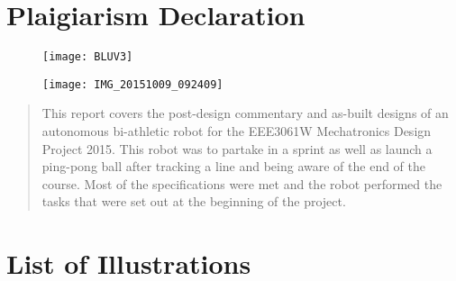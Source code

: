 \frontmatter
\setcounter{tocdepth}{3}                                                      %
\setcounter{secnumdepth}{2}                                     %

\clearpage
\section*{Plaigiarism Declaration}
\label{sec:Plaigiarism Declaration}

\clearpage
\begin{figure}[H]
  \begin{center}
    \texttt{[image: BLUV3]}
  \end{center}
\end{figure}

\begin{figure}[H]
  \begin{center}
    \texttt{[image: IMG\_20151009\_092409]}
  \end{center}
\end{figure}


\begin{abstract}
  \thispagestyle{empty}
  This report covers the post-design commentary and as-built designs of an autonomous bi-athletic robot for the EEE3061W Mechatronics Design Project 2015.  This robot was to partake in a sprint as well as launch a ping-pong ball after tracking a line and being aware of the end of the course. Most of the specifications were met and the robot performed the tasks that were set out at the beginning of the project.

\end{abstract}


\cleardoublepage
{}
\tableofcontents

\clearpage
\section*{List of Illustrations}
\label{sec:List of Illustrations}
\listoffigures
\clearpage

